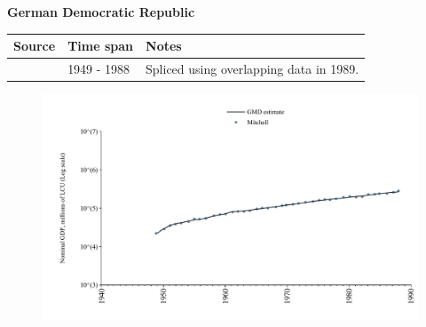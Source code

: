 \documentclass[12pt,a4paper,landscape]{article}
\begin{document}
\begin{adjustbox}{max totalsize={\paperwidth}{\paperheight},center}
\begin{minipage}[t][\textheight][t]{\textwidth}
\vspace*{0.5cm}
{}
\begin{center}
{\Large\bfseries German Democratic Republic}
\end{center}
\vspace{0.5cm}
\begin{table}[H]
\centering
\small
\begin{tabular}{|l|l|l|}
\hline
\textbf{Source} & \textbf{Time span} & \textbf{Notes} \\
\hline
\rowcolor{white}\cite{Mitchell}& 1949 - 1988 &Spliced using overlapping data in 1989.\\
\hline
\end{tabular}
\end{table}
\begin{figure}[H]
\centering
\includegraphics[width=\textwidth,height=0.6\textheight,keepaspectratio]{graphs/DDR_nGDP.pdf}
\end{figure}
\end{minipage}
\end{adjustbox}
\end{document}
